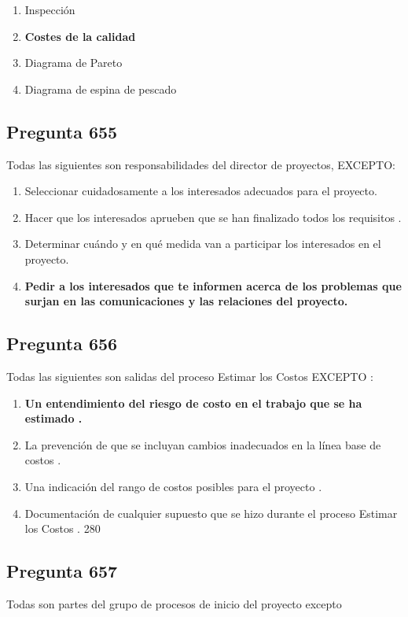 \documentclass[11pt,a4paper]{article}
\begin{document}
\begin{enumerate}[label=\alph*)]
  \item Inspección
  \item \textbf{Costes de la calidad}
  \item Diagrama de Pareto
  \item Diagrama de espina de pescado
\end{enumerate}

\subsection*{Pregunta 655}
Todas las siguientes son responsabilidades del director de proyectos, EXCEPTO:

\begin{enumerate}[label=\alph*)]
  \item Seleccionar cuidadosamente a los interesados adecuados para el proyecto.
  \item Hacer que los interesados aprueben que se han finalizado todos los requisitos .
  \item Determinar cuándo y en qué medida van a participar los interesados en el proyecto.
  \item \textbf{Pedir a los interesados que te informen acerca de los problemas que surjan en las comunicaciones y las relaciones del proyecto.}
\end{enumerate}

\subsection*{Pregunta 656}
Todas las siguientes son salidas del proceso Estimar los Costos EXCEPTO :

\begin{enumerate}[label=\alph*)]
  \item \textbf{Un entendimiento del riesgo de costo en el trabajo que se ha estimado .}
  \item La prevención de que se incluyan cambios inadecuados en la línea base de costos .
  \item Una indicación del rango de costos posibles para el proyecto .
  \item Documentación de cualquier supuesto que se hizo durante el proceso Estimar los Costos . 280
\end{enumerate}

\subsection*{Pregunta 657}
Todas son partes del grupo de procesos de inicio del proyecto excepto
\end{document}

